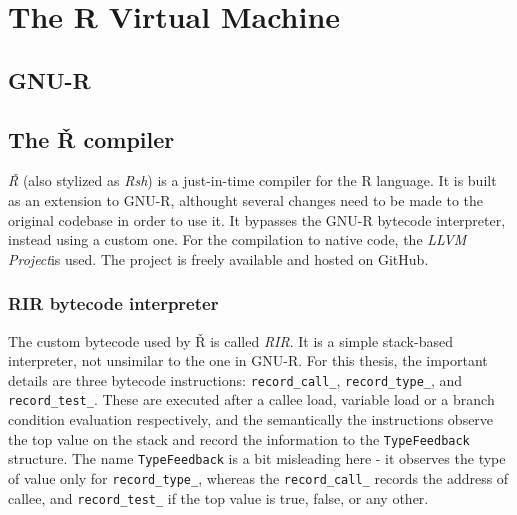 \chapter{The R Virtual Machine}


\section{GNU-R}

\section{The Ř compiler}

\textit{Ř} (also stylized as \textit{Rsh}) is a just-in-time compiler for the R language. It is built as an extension to GNU-R, althought several changes need to be made to the original codebase in order to use it. It bypasses the GNU-R bytecode interpreter, instead using a custom one. For the compilation to native code, the \textit{LLVM Project}\todocite is used. The project is freely available and hosted on GitHub.


\subsection{RIR bytecode interpreter}

The custom bytecode used by Ř is called \textit{RIR}. It is a simple stack-based interpreter, not unsimilar to the one in GNU-R. For this thesis, the important details are three bytecode instructions: \texttt{record\_call\_}, \texttt{record\_type\_}, and \texttt{record\_test\_}. These are executed after a callee load, variable load or a branch condition evaluation respectively, and the semantically the instructions observe the top value on the stack and record the information to the  \texttt{TypeFeedback} structure. The name \texttt{TypeFeedback} is a bit misleading here - it observes the type of value only for \texttt{record\_type\_}, whereas the \texttt{record\_call\_} records the address of callee, and \texttt{record\_test\_} if the top value is true, false, or any other.

